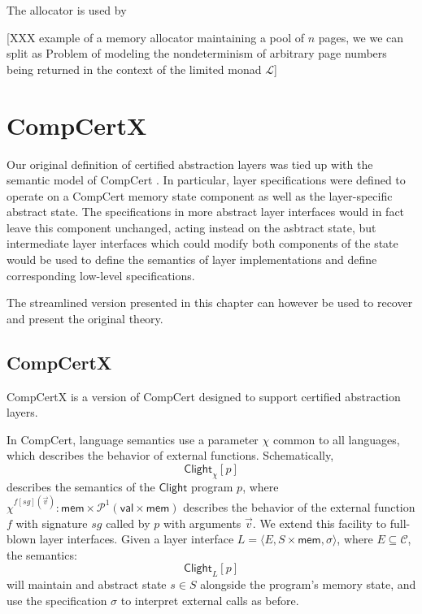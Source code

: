 \documentclass[11pt,oneside,draft]{book}
\theoremstyle{definition}
\newcommand{\kw}[1]{\ensuremath{ \mathsf{#1} }}
\begin{document}
The allocator is used by 

[XXX example of a memory allocator maintaining a pool of $n$ pages,
we we can split as
Problem of modeling the nondeterminism of
arbitrary page numbers being returned in the context
of the limited monad $\mathcal{L}$]



\section{CompCertX} \label{sec:cal:compcertx} %

Our original definition of certified abstraction layers
was tied up with the semantic model of CompCert
\citep{popl15}.
In particular,
layer specifications were defined to operate
on a CompCert memory state component as well as
the layer-specific abstract state.
The specifications in more abstract layer interfaces 
would in fact leave this component unchanged,
acting instead on the asbtract state,
but intermediate layer interfaces which could
modify both components of the state would be used
to define the semantics of layer implementations
and define corresponding low-level specifications.

The streamlined version presented in this chapter
can however be used to recover and present the original theory.

\subsection{CompCertX}

CompCertX is a version of CompCert
designed to support certified abstraction layers.

In CompCert,
language semantics use a parameter
$\chi$
common to all languages,
which describes the behavior of external functions.
Schematically,
\[
  \kw{Clight}_\chi[p]
\]
describes the semantics of the \kw{Clight} program $p$,
where
$\chi^{f[\mathit{sg}](\vec{v})} :
 \kw{mem} \times \mathcal{P}^1(\kw{val} \times \kw{mem})$
describes the behavior of
the external function $f$ with signature $\mathit{sg}$
called by $p$ with arguments $\vec{v}$.
We extend this facility to full-blown layer interfaces.
Given a layer interface
$L = \langle E, S \times \kw{mem}, \sigma \rangle$,
where
$E \subseteq \mathcal{C}$,
the semantics:
\[
  \kw{Clight}_L[p]
\]
will maintain and abstract state $s \in S$
alongside the program's memory state,
and use the specification $\sigma$
to interpret external calls as before.
\end{document}
